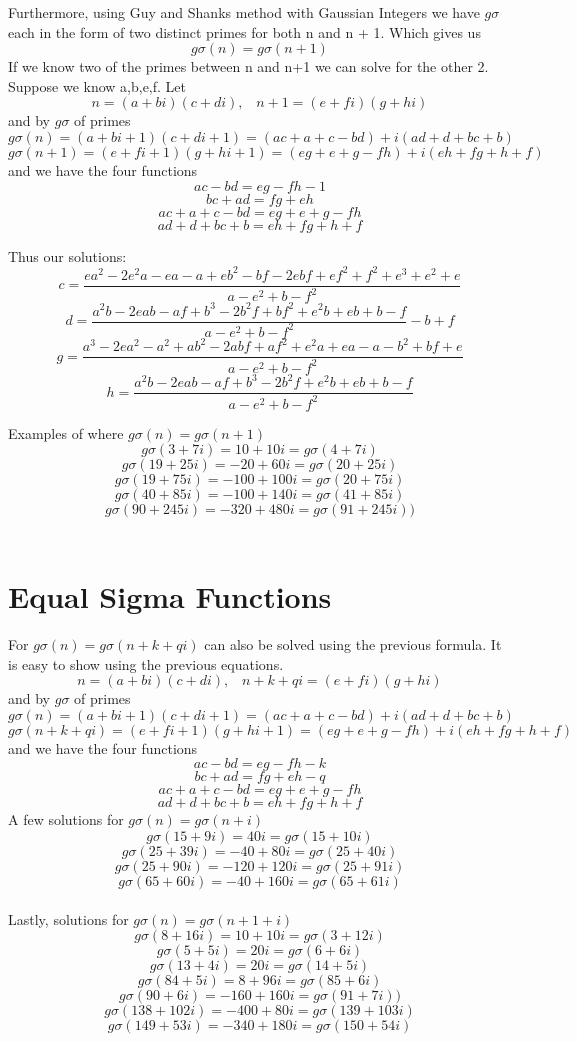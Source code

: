 \documentclass[12pt]{amsart}
\begin{document}
Furthermore, using Guy and Shanks method with Gaussian Integers we have $g\sigma$ each in the form of two distinct primes for both n and n + 1. Which gives us $$g\sigma(n) = g\sigma(n+1)$$ If we know two of the primes between n and n+1 we can solve for the other 2. Suppose we know a,b,e,f.
Let $$n = (a + bi)(c+di), \; \; \; n+1 = (e + fi)(g + hi)$$ and by $g\sigma$ of primes  $$ g\sigma(n) = (a + bi + 1)(c + di + 1) = (ac + a + c -bd) + i(ad + d + bc + b)$$ $$ g\sigma(n+1) = (e + fi + 1)(g + hi + 1) = (eg + e + g - fh) + i(eh + fg + h + f)$$ and we have the four functions $$ac -bd = eg -fh - 1$$ $$bc + ad = fg + eh$$ $$ac + a + c -bd = eg + e + g - fh$$ $$ad + d + bc + b = eh + fg + h + f$$

Thus our solutions: 
$$c = \frac{ea^2 - 2e^2a -ea -a + eb^2 -bf -2ebf + ef^2 + f^2 + e^3 + e^2 + e} {a-e^2+b-f^2}$$ 
$$d = \frac{a^2b - 2eab -af +b^3 -2b^2f + bf^2 + e^2b + eb + b - f}{a-e^2 + b -f^2} -b + f$$ 
$$g = \frac{a^3 -2ea^2 - a^2 + ab^2 - 2abf + af^2 + e^2a + ea - a -b^2 + bf + e} {a-e^2+b-f^2}$$ 
$$h = \frac{a^2b - 2eab -af + b^3 - 2b^2f + e^2b + eb +b -f} {a-e^2+b-f^2}$$


Examples of where $g\sigma(n) = g\sigma(n+1)$
\\
$$g\sigma(3 + 7i) = 10 + 10i = g\sigma(4 + 7i)$$
$$g\sigma(19 + 25i) = -20 + 60i = g\sigma(20 + 25i)$$
$$g\sigma(19 + 75i) = -100 + 100i = g\sigma(20 + 75i)$$
$$g\sigma(40 + 85i) = -100 + 140i  = g\sigma(41 + 85i)$$
$$g\sigma(90 + 245i) = -320 + 480i  = g\sigma(91 + 245i))$$
\\

\section{Equal Sigma Functions}
For $g\sigma(n) = g\sigma(n+k+qi)$ can also be solved using the previous formula. It is easy to show using the previous equations. 
$$n = (a + bi)(c+di), \; \; \; n+k+qi = (e + fi)(g + hi)$$ and by $g\sigma$ of primes $$ g\sigma(n) = (a + bi + 1)(c + di + 1) = (ac + a + c -bd) + i(ad + d + bc + b)$$ $$ g\sigma(n+k+qi) = (e + fi + 1)(g + hi + 1) = (eg + e + g - fh) + i(eh + fg + h + f)$$ and we have the four functions $$ac -bd = eg -fh - k$$ $$bc + ad = fg + eh - q$$ $$ac + a + c -bd = eg + e + g - fh$$ $$ad + d + bc + b = eh + fg + h + f$$
A few solutions for $g\sigma(n) = g\sigma(n+i)$
\\
$$g\sigma(15 + 9i) = 40i = g\sigma(15 + 10i)$$
$$g\sigma(25 + 39i) = -40 + 80i  = g\sigma( 25 + 40i)$$
$$g\sigma(25 + 90i) = -120 + 120i  = g\sigma(25 + 91i)$$
$$g\sigma(65 + 60i) = -40 + 160i = g\sigma(65 + 61i)$$
\\
Lastly, solutions for $g\sigma(n) = g\sigma(n+1+i)$
\\
$$g\sigma(8 + 16i) = 10 + 10i = g\sigma(3 + 12i)$$
$$g\sigma(5 + 5i) = 20i = g\sigma(6 + 6i)$$
$$g\sigma(13 + 4i) = 20i = g\sigma(14 + 5i)$$
$$g\sigma(84 + 5i) = 8 + 96i  = g\sigma(85 + 6i)$$
$$g\sigma(90 + 6i) = -160 + 160i  = g\sigma(91 + 7i))$$
$$g\sigma(138 + 102i) = -400 + 80i = g\sigma(139 + 103i)$$
$$g\sigma(149 + 53i) = -340 + 180i = g\sigma(150 + 54i)$$
\end{document}
